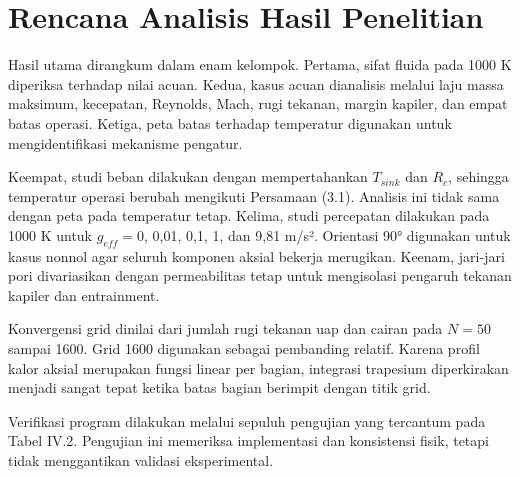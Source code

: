 \documentclass[
  12pt,
  12pt,a4paper,oneside]{report}
\begin{document}
\hypertarget{rencana-analisis-hasil-penelitian}{%
\section{Rencana Analisis Hasil
Penelitian}\label{rencana-analisis-hasil-penelitian}}

Hasil utama dirangkum dalam enam kelompok. Pertama, sifat fluida pada
1000 K diperiksa terhadap nilai acuan. Kedua, kasus acuan dianalisis
melalui laju massa maksimum, kecepatan, Reynolds, Mach, rugi tekanan,
margin kapiler, dan empat batas operasi. Ketiga, peta batas terhadap
temperatur digunakan untuk mengidentifikasi mekanisme pengatur.

Keempat, studi beban dilakukan dengan mempertahankan \(T_{sink}\) dan
\(R_c\), sehingga temperatur operasi berubah mengikuti Persamaan (3.1).
Analisis ini tidak sama dengan peta pada temperatur tetap. Kelima, studi
percepatan dilakukan pada 1000 K untuk \(g_{eff}=0\), 0,01, 0,1, 1, dan
9,81 m/s². Orientasi 90° digunakan untuk kasus nonnol agar seluruh
komponen aksial bekerja merugikan. Keenam, jari-jari pori divariasikan
dengan permeabilitas tetap untuk mengisolasi pengaruh tekanan kapiler
dan entrainment.

Konvergensi grid dinilai dari jumlah rugi tekanan uap dan cairan pada
\(N=50\) sampai 1600. Grid 1600 digunakan sebagai pembanding relatif.
Karena profil kalor aksial merupakan fungsi linear per bagian, integrasi
trapesium diperkirakan menjadi sangat tepat ketika batas bagian berimpit
dengan titik grid.

Verifikasi program dilakukan melalui sepuluh pengujian yang tercantum
pada Tabel IV.2. Pengujian ini memeriksa implementasi dan konsistensi
fisik, tetapi tidak menggantikan validasi eksperimental.
\end{document}
